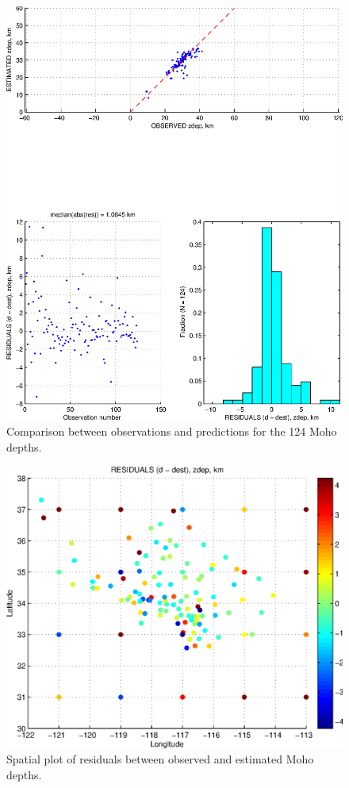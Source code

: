 \documentclass[11pt,titlepage,fleqn]{article}
\begin{document}
\begin{figure}
\includegraphics[width=16cm]{fig1D_5.eps}
\caption[]
{{
Comparison between observations and predictions for the 124 Moho depths.
\label{fig:1D_5}
}}
\end{figure}

\begin{figure}
\includegraphics[width=16cm]{fig1D_6.eps}
\caption[]
{{
Spatial plot of residuals between observed and estimated Moho depths.
\label{fig:1D_6}
}}
\end{figure}
\end{document}
